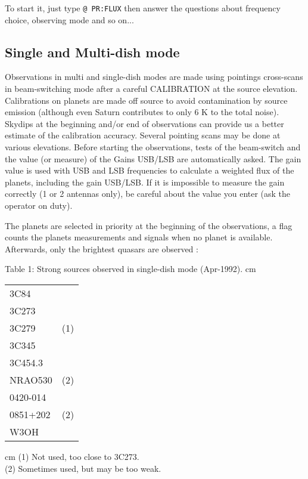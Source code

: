 \documentclass[11pt]{article}
\begin{document}
To start it, just type {\tt @ PR:FLUX} then answer the questions about
frequency choice, observing mode and so on...

\subsection{ Single and Multi-dish mode}

Observations in multi and single-dish modes are made using pointings
cross-scans in beam-switching mode after a careful CALIBRATION at the
source elevation.  Calibrations on planets are made off source to avoid
contamination by source emission (although even Saturn contributes to only
6 K to the total noise).  Skydips at the beginning and/or end of
observations can provide us a better estimate of the calibration accuracy.
Several pointing scans may be done at various elevations.  Before starting
the observations, tests of the beam-switch and the value (or measure) of
the Gains USB/LSB are automatically asked.  The gain value is used with USB
and LSB frequencies to calculate a weighted flux of the planets, including
the gain USB/LSB.  If it is impossible to measure the gain correctly (1 or
2 antennas only), be careful about the value you enter (ask the operator on
duty).

The planets are selected in priority at the beginning of the observations,
a flag counts the planets measurements and signals when no planet is
available.  Afterwards, only the brightest quasars are observed :

\begin{flushleft}
  {Table 1: Strong sources observed in single-dish mode (Apr-1992).}
   cm
\begin{tabular}{|l|l|}
\hline
\hline
3C84 & \\
3C273 & \\
3C279 & (1) \\
3C345 & \\
3C454.3 & \\
NRAO530 & (2) \\
0420-014 & \\
0851+202 & (2) \\
\hline
W3OH & \\
\hline
\hline
\end{tabular}
 cm
(1) Not used, too close to 3C273. \\
(2) Sometimes used, but may be too weak. \\
\end{flushleft}
\end{document}
